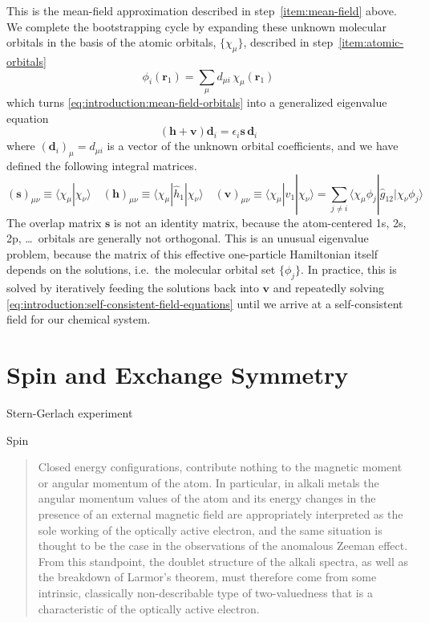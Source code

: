 This is the mean-field approximation described in step~\ref{item:mean-field}
above.
We complete the bootstrapping cycle by expanding these unknown molecular
orbitals in the basis of the atomic orbitals, \(\{\chi_\mu\}\), described in
step~\ref{item:atomic-orbitals}
\begin{equation}
    \phi_i(\mathbf{r}_1)
    =
    \sum_\mu
    d_{\mu i}\,
    \chi_\mu(\mathbf{r}_1)
\end{equation}
which turns \cref{eq:introduction:mean-field-orbitals} into a generalized
eigenvalue equation
\begin{equation}
    \label{eq:introduction:self-consistent-field-equations}
    (
        \mathbf{h}
        +
        \mathbf{v}
    )
    \mathbf{d}_i
    =
    \epsilon_i
    \mathbf{s}\,
    \mathbf{d}_i
\end{equation}
where \((\mathbf{d}_i)_\mu=d_{\mu i}\) is a vector of the unknown orbital
coefficients, and we have defined the following integral matrices.
\begin{equation}
    (\mathbf{s})_{\mu\nu}
    \equiv
    \langle\chi_\mu|\chi_\nu\rangle
    \quad
    (\mathbf{h})_{\mu\nu}
    \equiv
    \langle\chi_\mu|\hat{h}_1|\chi_\nu\rangle
    \quad
    (\mathbf{v})_{\mu\nu}
    \equiv
    \langle\chi_\mu|\hat{v}_1|\chi_\nu\rangle
    =
    \sum_{j\neq i}
    \langle\chi_\mu\phi_j|\hat{g}_{12}|\chi_\nu\phi_j\rangle
\end{equation}
The overlap matrix \(\mathbf{s}\) is not an identity matrix, because the
atom-centered 1s, 2s, 2p, \dots\ orbitals are generally not orthogonal.
This is an unusual eigenvalue problem, because the matrix of this effective
one-particle Hamiltonian itself depends on the solutions, i.e.~the molecular
orbital set \(\{\phi_j\}\).
In practice, this is solved by iteratively feeding the solutions back into
\(\mathbf{v}\) and repeatedly solving
\cref{eq:introduction:self-consistent-field-equations} until we arrive at a
self-consistent field for our chemical system.


\section{Spin and Exchange Symmetry}

\noindent
Stern-Gerlach experiment\cite{Gerlach:1922p349}

\noindent
Spin\cite{Pauli:1925p373}
\begin{quote}
    Closed energy configurations, contribute nothing to the magnetic moment or
    angular momentum of the atom.
    In particular, in alkali metals the angular momentum values of the atom and
    its energy changes in the presence of an external magnetic field are
    appropriately interpreted as the sole working of the optically active
    electron, and the same situation is thought to be the case in the
    observations of the anomalous Zeeman effect.
    From this standpoint, the doublet structure of the alkali spectra, as well
    as the breakdown of Larmor's theorem, must therefore come from some
    intrinsic, classically non-describable type of two-valuedness that is a
    characteristic of the optically active electron.
\end{quote}

